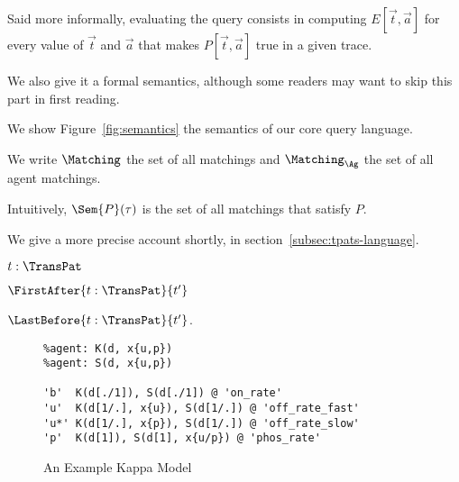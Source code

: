 Said more informally, evaluating the query consists in
computing $E[\Vec{t}, \Vec{a}]$ for every value of $\Vec{t}$ and $\Vec{a}$
that makes $P[\Vec{t}, \Vec{a}]$ true in a given trace.

We also give it a formal semantics, although some
readers may want to skip this part in first reading.

We show Figure~\ref{fig:semantics} the semantics of our core query
language.

We write $\Matching$
the set of all matchings and $\Matching_{\Ag}$ the set of all agent matchings.

 Intuitively, $\Sem{P}(\tau)$ is 
the set of all matchings that satisfy $P$.

 We give a more precise
 account shortly, in section~\ref{subsec:tpats-language}.

 \begin{inparaenum}[(i)]
   \item $t:\TransPat$
   \item $\FirstAfter{t:\TransPat}{t'}$
   \item $\LastBefore{t:\TransPat}{t'}$.
 \end{inparaenum}

\begin{figure}
\begin{small}
\begin{verbatim}
%agent: K(d, x{u,p})
%agent: S(d, x{u,p})

'b'  K(d[./1]), S(d[./1]) @ 'on_rate'
'u'  K(d[1/.], x{u}), S(d[1/.]) @ 'off_rate_fast'
'u*' K(d[1/.], x{p}), S(d[1/.]) @ 'off_rate_slow'
'p'  K(d[1]), S(d[1], x{u/p}) @ 'phos_rate'
\end{verbatim}
\end{small}
\caption{An Example Kappa Model}\label{fig:model}
\end{figure}
